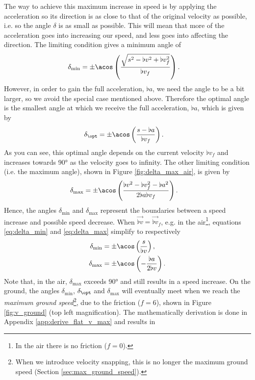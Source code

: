 The way to achieve this maximum increase in speed is by applying the acceleration so its direction is as close to that of the original velocity as possible, i.e. so the angle $\delta$ is as small as possible. This will mean that more of the acceleration goes into increasing our speed, and less goes into affecting the direction. The limiting condition gives a minimum angle of
\begin{align}
\label{eq:delta_min}
\delta_{\min} &= \pm\acos\left(\frac{\sqrt{s^2 - \flat{v}^2 + \flat{v}_f^2}}{\flat{v}_f} \right).
\end{align}
However, in order to gain the full acceleration, $\flat{a}$, we need the angle to be a bit larger, so we avoid the special case mentioned above. Therefore the optimal angle is the smallest angle at which we receive the full acceleration, $\flat{a}$, which is given by
\begin{align}
\label{eq:delta_opt}
\delta_{\opt} &= \pm\acos\left( \frac{s - \flat{a}}{\flat{v}_f} \right).
\end{align}
As you can see, this optimal angle depends on the current velocity $\flat{v}_f$ and increases towards \ang{90} as the velocity goes to infinity. The other limiting condition (i.e. the maximum angle), shown in Figure \ref{fig:delta_max_air}, is given by
\begin{align}
\label{eq:delta_max}
\delta_{\max} &= \pm\acos\left( \frac{\flat{v}^2 - \flat{v}_f^2 - \flat{a}^2}{2 \flat{a} \flat{v}_f} \right).
\end{align}
Hence, the angles $\delta_{\min}$ and $\delta_{\max}$ represent the boundaries between a speed increase and possible speed decrease. When $\vec{\flat{v}} = \vec{\flat{v}}_f$, e.g. in the air\footnote{In the air there is no friction ($f = 0$).}, equations \eqref{eq:delta_min} and \eqref{eq:delta_max} simplify to respectively
\begin{align}
\label{eq:delta_min_vf}
\delta_{\min} &= \pm\acos\left(\frac{s}{\flat{v}} \right),\\
\label{eq:delta_max_vf}
\delta_{\max} &= \pm\acos\left(-\frac{\flat{a}}{2\flat{v}} \right).
\end{align}
Note that, in the air, $\delta_{\max}$ exceeds \ang{90} and still results in a speed increase. On the ground, the angles $\delta_{\min}$, $\delta_{\opt}$ and $\delta_{\max}$ will eventually meet when we reach the \emph{maximum ground speed}\footnote{When we introduce velocity snapping, this is no longer the maximum ground speed (Section \ref{sec:max_ground_speed}).}, due to the friction ($f = 6$), shown in Figure \ref{fig:v_ground} (top left magnification). The mathematically derivation is done in Appendix \ref{app:derive_flat_v_max} and results in
